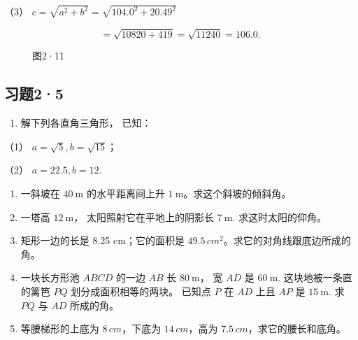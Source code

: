 （3） \(c = \sqrt{a^2 + b^2} = \sqrt{104.0^2 + 20.49^2}\)

\[
= \sqrt {10820 + 419} = \sqrt {11240} = 106.0.
\]

\begin{figure}
\centering
{}
\caption{图2·11}
\end{figure}


\subsection{习题2·5}

\begin{enumerate}
\item
  解下列各直角三角形， 已知：
\end{enumerate}

（1） \(a = \sqrt{5}, b = \sqrt{15}\)；

（2） \(a = 22.5, b = 12.\)

\begin{enumerate}[start=2]
\item
  一斜坡在 \(40 \mathrm{~m}\) 的水平距离间上升
  \(1 \mathrm{~m}\)。求这个斜坡的倾斜角。
\item
  一塔高 \(12 \mathrm{~m}\)， 太阳照射它在平地上的阴影长
  \(7 \mathrm{~m}\). 求这时太阳的仰角。
\item
  矩形一边的长是 8.25 cm；它的面积是
  \(49.5 \, cm^{2}\)。求它的对角线跟底边所成的角。
\item
  一块长方形池 \(ABCD\) 的一边 \(AB\) 长 \(80 \mathrm{~m}\)， 宽 \(AD\)
  是 \(60 \mathrm{~m}\). 这块地被一条直的篱笆 \(PQ\)
  划分成面积相等的两块。 已知点 \(P\) 在 \(AD\) 上且 \(AP\) 是
  \(15 \mathrm{~m}\). 求 \(PQ\) 与 \(AD\) 所成的角。
\item
  等腰梯形的上底为 \(8 \, cm\)，下底为 \(14 \, cm\)，高为
  \(7.5 \, cm\)，求它的腰长和底角。
\end{enumerate}

